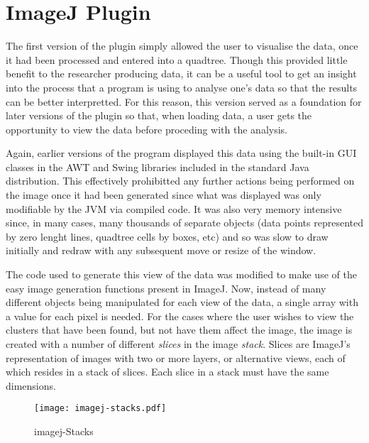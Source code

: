 
\section{ImageJ Plugin}
\label{sec:imagej_plugin}

The first version of the plugin simply allowed the user to visualise the data,
once it had been processed and entered into a quadtree. Though this provided
little benefit to the researcher producing data, it can be a useful tool to get
an insight into the process that a program is using to analyse one's data so
that the results can be better interpretted. For this reason, this version
served as a foundation for later versions of the plugin so that, when loading
data, a user gets the opportunity to view the data before proceding with the
analysis.

Again, earlier versions of the program displayed this data using the built-in
GUI classes in the AWT and Swing libraries included in the standard Java
distribution. This effectively prohibitted any further actions being performed
on the image once it had been generated since what was displayed was only
modifiable by the JVM via compiled code. It was also very memory intensive
since, in many cases, many thousands of separate objects (data points
represented by zero lenght lines, quadtree cells by boxes, etc) and so was slow
to draw initially and redraw with any subsequent move or resize of the window.

The code used to generate this view of the data was modified to make use of the
easy image generation functions present in ImageJ. Now, instead of many
different objects being manipulated for each view of the data, a single array
with a value for each pixel is needed. For the cases where the user wishes to
view the clusters that have been found, but not have them affect the image, the
image is created with a number of different \emph{slices} in the image
\emph{stack}. Slices are ImageJ's representation of images with two or more
layers, or alternative views, each of which resides in a stack of slices. Each
slice in a stack must have the same dimensions.

\begin{figure}[tbhp]
	\centering
	\texttt{[image: imagej-stacks.pdf]}
	\caption{imagej-Stacks}
	\label{fig:imagej-stacks}
\end{figure}

